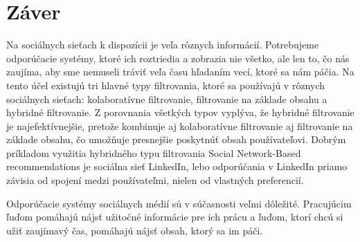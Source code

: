 \documentclass[10pt,twoside,slovak,a4paper]{article}
\begin{document}
\section{Záver}\label{zaver}

Na sociálnych sieťach k dispozícii je veľa rôznych informácií. Potrebujeme odporúčacie systémy, ktoré ich roztriedia a zobrazia nie všetko, ale len to, čo nás zaujíma, aby sme nemuseli tráviť veľa času hľadaním vecí, ktoré sa nám páčia. Na tento účel existujú tri hlavné typy filtrovania, ktoré sa používajú v rôznych sociálnych sieťach: kolaboratívne filtrovanie, filtrovanie na základe obsahu a hybridné filtrovanie. Z porovnania všetkých typov vyplýva, že hybridné filtrovanie je najefektívnejšie, pretože kombinuje aj kolaboratívne filtrovanie aj filtrovanie na základe obsahu, čo umožňuje presnejšie poskytnúť obsah používateľovi. Dobrým príkladom využitia hybridného typu filtrovania Social Network-Based recommendations je sociálna sieť LinkedIn, lebo odporúčania v LinkedIn priamo závisia od spojení medzi používateľmi, nielen od vlastných preferencií.

Odporúčacie systémy sociálnych médií sú v súčasnosti veľmi dôležité. Pracujúcim ľuďom pomáhajú nájsť užitočné informácie pre ich prácu a ľuďom, ktorí chcú si užiť zaujímavý čas, pomáhajú nájsť obsah, ktorý sa im páči.




\end{document}
